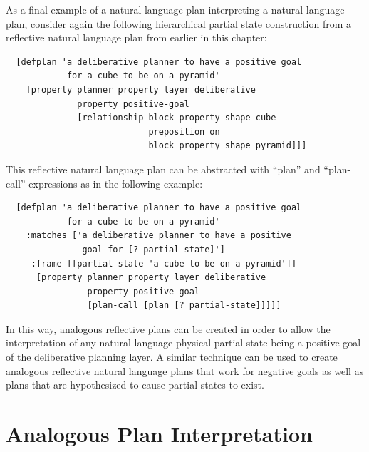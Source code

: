 As a final example of a natural language plan interpreting a natural
language plan, consider again the following hierarchical partial state
construction from a reflective natural language plan from earlier in
this chapter:
\begin{samepage}
\begin{Verbatim}
  [defplan 'a deliberative planner to have a positive goal
            for a cube to be on a pyramid'
    [property planner property layer deliberative
              property positive-goal
              [relationship block property shape cube
                            preposition on
                            block property shape pyramid]]]
\end{Verbatim}
\end{samepage}
This reflective natural language plan can be abstracted with ``plan''
and ``plan-call'' expressions as in the following example:
\begin{samepage}
\begin{Verbatim}
  [defplan 'a deliberative planner to have a positive goal
            for a cube to be on a pyramid'
    :matches ['a deliberative planner to have a positive
               goal for [? partial-state]']
     :frame [[partial-state 'a cube to be on a pyramid']]
      [property planner property layer deliberative
                property positive-goal
                [plan-call [plan [? partial-state]]]]]
\end{Verbatim}
\end{samepage}
In this way, analogous reflective plans can be created in order to
allow the interpretation of any natural language physical partial
state being a positive goal of the deliberative planning layer.  A
similar technique can be used to create analogous reflective natural
language plans that work for negative goals as well as plans that are
hypothesized to cause partial states to exist.

\section{Analogous Plan Interpretation}

